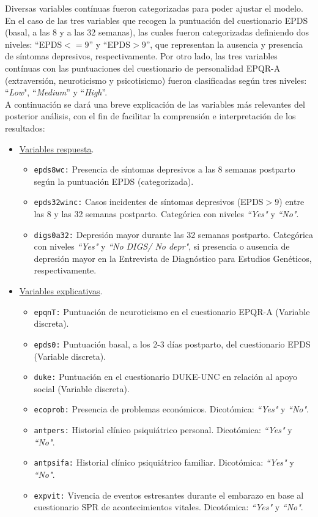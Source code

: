 Diversas variables contínuas fueron categorizadas para poder ajustar el modelo. En el caso de las tres variables que recogen la puntuación del cuestionario EPDS (basal, a las 8 y a las 32 semanas), las cuales fueron categorizadas definiendo dos niveles: ``EPDS$<=9$'' y ``EPDS$>9$'', que representan la ausencia y presencia de síntomas depresivos, respectivamente. Por otro lado, las tres variables contínuas con las puntuaciones del cuestionario de personalidad EPQR-A (extraversión, neuroticismo y psicotisicmo) fueron clasificadas según tres niveles: ``\textit{Low}", ``\textit{Medium}'' y ``\textit{High}''.\\

A continuación se dará una breve explicación de las variables más relevantes del  posterior análisis, con el fin de facilitar la comprensión e interpretación de los resultados:

\begin{itemize}
	\item \underline{Variables respuesta}.
		\begin{itemize}
			\item \lstinline{epds8wc:} Presencia de síntomas depresivos a las 8 semanas postparto según la puntuación EPDS (categorizada). 
			\item \lstinline{epds32winc:} Casos incidentes de síntomas depresivos (EPDS$>9$) entre las 8 y las 32 semanas postparto. Categórica con niveles \textit{``Yes"} y \textit{``No"}.
			\item \lstinline{digs0a32:} Depresión mayor durante las 32 semanas postparto.  Categórica con niveles \textit{``Yes"} y \textit{``No DIGS/ No depr"}, si presencia o ausencia de depresión mayor en la Entrevista de Diagnóstico para Estudios Genéticos, respectivamente. 
		\end{itemize}
	\item \underline{Variables explicativas}.
		\begin{itemize}
			\item \lstinline{epqnT:} Puntuación de neuroticismo en el cuestionario EPQR-A (Variable discreta).
			\item \lstinline{epds0:} Puntuación basal, a los 2-3 días postparto, del cuestionario EPDS (Variable discreta).
			\item \lstinline{duke:} Puntuación en el cuestionario DUKE-UNC en relación al apoyo social (Variable discreta).
			\item \lstinline{ecoprob:} Presencia de problemas económicos. Dicotómica: \textit{``Yes"} y \textit{``No"}.
			\item \lstinline{antpers:} Historial clínico psiquiátrico personal. Dicotómica: \textit{``Yes"} y \textit{``No"}.
			\item \lstinline{antpsifa:} Historial clínico psiquiátrico familiar. Dicotómica: \textit{``Yes"} y \textit{``No"}.
			\item \lstinline{expvit:} Vivencia de eventos estresantes durante el embarazo en base al cuestionario SPR de acontecimientos vitales. Dicotómica: \textit{``Yes"} y \textit{``No"}.
		\end{itemize}
\end{itemize}

